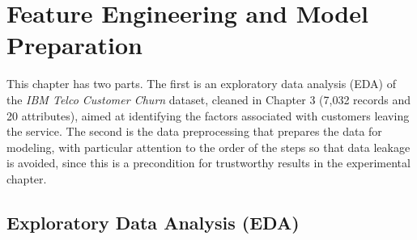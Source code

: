 
\section{Feature Engineering and Model Preparation}
\label{chap:eda_prep}

This chapter has two parts. The first is an exploratory data analysis (EDA) of the \textit{IBM Telco Customer Churn} dataset, cleaned in Chapter 3 (7,032 records and 20 attributes), aimed at identifying the factors associated with customers leaving the service. The second is the data preprocessing that prepares the data for modeling, with particular attention to the order of the steps so that data leakage is avoided, since this is a precondition for trustworthy results in the experimental chapter.

\subsection{Exploratory Data Analysis (EDA)}
\label{sec:eda}

